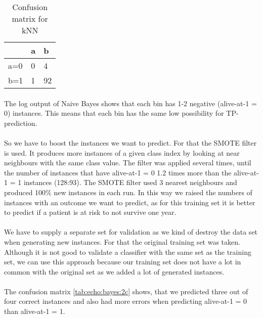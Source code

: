 \documentclass[paper=a4, fontsize=11pt]{scrartcl} %
\numberwithin{equation}{section} %
\numberwithin{figure}{section} %
\numberwithin{table}{section} %
\begin{document}
\begin{table}[h]
\centering
\begin{tabular}{|l|ll|}
\hline
 & a &	b \\
\hline
a=0 & 0 & 4 \\
b=1 & 1 & 92\\
\hline
\end{tabular}
\caption{Confusion matrix for kNN}
\label{tab:echo:bayes:1c}
\end{table}

\paragraph{}The log output of Naive Bayes shows that each bin has 1-2 negative (alive-at-1 = 0) instances. This means that each bin has the same low possibility for TP-prediction.

\paragraph{}So we have to boost the instances we want to predict. For that the SMOTE filter is used. It produces more instances of a given class index by looking at near neighbours with the same class value. The filter was applied several times, until the number of instances that have alive-at-1 = 0 1.2 times more than the alive-at-1 = 1 instances (128:93). The SMOTE filter used 3 nearest neighbours and produced 100\% new instances in each run. In this way we raised the numbers of instances with an outcome we want to predict, as for this training set it is better to predict if a patient is at risk to not survive one year.

\paragraph{}We have to supply a separate set for validation as we kind of destroy the data set when generating new instances. For that the original training set was taken. Although it is not good to validate a classifier with the same set as the training set, we can use this approach because our training set does not have a lot in common with the original set as we added a lot of generated instances.


\paragraph{}The confusion matrix \ref{tab:echo:bayes:2c} shows, that we predicted three out of four correct instances and also had more errors when predicting alive-at-1 = 0 than  alive-at-1 = 1.
\end{document}
